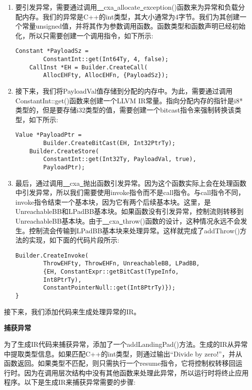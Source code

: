 \begin{enumerate}
\item 要引发异常，需要通过调用\underline{~~}cxa\underline{~}allocate\underline{~}exception()函数来为异常和负载分配内存。我们的异常是C++的int类型，其大小通常为4字节。我们为其创建一个常量unsigned值，并将其作为参数调用函数。函数类型和函数声明已经初始化，所以只需要创建一个调用指令，如下所示:
\begin{lstlisting}[caption={}]
	Constant *PayloadSz =
		ConstantInt::get(Int64Ty, 4, false);
	CallInst *EH = Builder.CreateCall(
		AllocEHFty, AllocEHFn, {PayloadSz});
\end{lstlisting}

\item 接下来，我们将PayloadVal值存储到分配的内存中。为此，需要通过调用ConstantInt::get()函数来创建一个LLVM IR常量。指向分配内存的指针是i8*类型的，但是要存储i32类型的值，需要创建一个bitcast指令来强制转换该类型，如下所示:
\begin{lstlisting}[caption={}]
	Value *PayloadPtr =
		Builder.CreateBitCast(EH, Int32PtrTy);
	Builder.CreateStore(
		ConstantInt::get(Int32Ty, PayloadVal, true),
		PayloadPtr);
\end{lstlisting}

\item 最后，通过调用\underline{~~}cxa\underline{~}抛出函数引发异常。因为这个函数实际上会在处理函数中引发异常，所以我们需要使用invoke指令而不是call指令。与call指令不同，invoke指令结束一个基本块，因为它有两个后续基本块。这里，是UnreachableBB和LPadBB基本块。如果函数没有引发异常，控制流则转移到UnreachableBB基本块。由于\underline{~~}cxa\underline{~}throw()函数的设计，这种情况永远不会发生。控制流会传输到LPadBB基本块来处理异常。这样就完成了addThrow()方法的实现，如下面的代码片段所示:
\begin{lstlisting}[caption={}]
	Builder.CreateInvoke(
		ThrowEHFty, ThrowEHFn, UnreachableBB, LPadBB,
		{EH, ConstantExpr::getBitCast(TypeInfo, 
		Int8PtrTy),
		ConstantPointerNull::get(Int8PtrTy)});
}
\end{lstlisting}
\end{enumerate}

接下来，我们添加代码来生成处理异常的IR。\par

\hspace*{\fill} \par %
\textbf{捕获异常}

为了生成IR代码来捕获异常，添加了一个addLandingPad()方法。生成的IR从异常中提取类型信息。如果匹配C++的int类型，则通过输出“Divide by zero!”，并从函数返回。如果类型不匹配，则只需执行一个resume指令，它将控制权转移回运行时。因为在调用层次结构中没有其他函数来处理此异常，所以运行时将终止应用程序。以下是生成IR来捕获异常需要的步骤:\par

